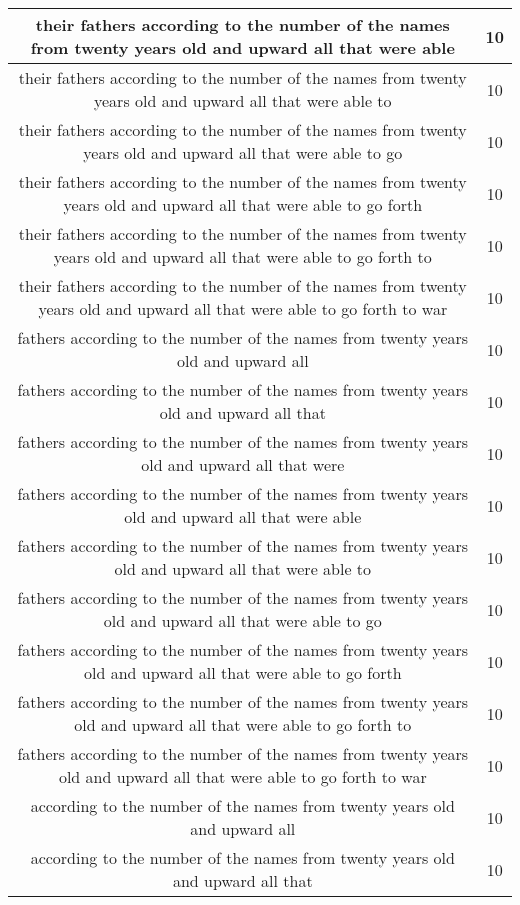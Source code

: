 \begin{center}
\begin{longtable}{|c|c|}
their fathers according to the number of the names from twenty years old and upward all that were able & 10\\ \hline 
their fathers according to the number of the names from twenty years old and upward all that were able to & 10\\ \hline 
their fathers according to the number of the names from twenty years old and upward all that were able to go & 10\\ \hline 
their fathers according to the number of the names from twenty years old and upward all that were able to go forth & 10\\ \hline 
their fathers according to the number of the names from twenty years old and upward all that were able to go forth to & 10\\ \hline 
their fathers according to the number of the names from twenty years old and upward all that were able to go forth to war & 10\\ \hline 
fathers according to the number of the names from twenty years old and upward all & 10\\ \hline 
fathers according to the number of the names from twenty years old and upward all that & 10\\ \hline 
fathers according to the number of the names from twenty years old and upward all that were & 10\\ \hline 
fathers according to the number of the names from twenty years old and upward all that were able & 10\\ \hline 
fathers according to the number of the names from twenty years old and upward all that were able to & 10\\ \hline 
fathers according to the number of the names from twenty years old and upward all that were able to go & 10\\ \hline 
fathers according to the number of the names from twenty years old and upward all that were able to go forth & 10\\ \hline 
fathers according to the number of the names from twenty years old and upward all that were able to go forth to & 10\\ \hline 
fathers according to the number of the names from twenty years old and upward all that were able to go forth to war & 10\\ \hline 
according to the number of the names from twenty years old and upward all & 10\\ \hline 
according to the number of the names from twenty years old and upward all that & 10\\ \hline 

\end{longtable}
\end{center}
